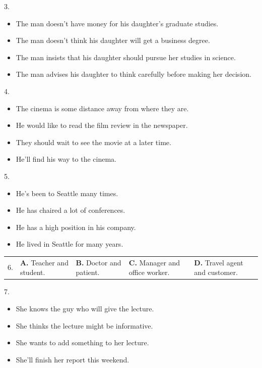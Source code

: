 \documentclass[UTF8,11pt]{ctexart}
\begin{document}
3.


\begin{itemize}[leftmargin=2em,itemsep=.2em,topsep=.4em]\item[A.] The man doesn’t have money for his daughter’s graduate studies.
\item[B.] The man doesn’t think his daughter will get a business degree.
\item[C.] The man insists that his daughter should pursue her studies in science.
\item[D.] The man advises his daughter to think carefully before making her decision.
\end{itemize}

4.


\begin{itemize}[leftmargin=2em,itemsep=.2em,topsep=.4em]\item[A.] The cinema is some distance away from where they are.
\item[B.] He would like to read the film review in the newspaper.
\item[C.] They should wait to see the movie at a later time.
\item[D.] He’ll find his way to the cinema.
\end{itemize}

5.


\begin{itemize}[leftmargin=2em,itemsep=.2em,topsep=.4em]\item[A.] He’s been to Seattle many times.
\item[B.] He has chaired a lot of conferences.
\item[C.] He has a high position in his company.
\item[D.] He lived in Seattle for many years.
\end{itemize}

\noindent\begin{tabularx}{\linewidth}{@{}lXXXX@{}}6. & \textbf{A.} Teacher and student. & \textbf{B.} Doctor and patient. & \textbf{C.} Manager and office worker. & \textbf{D.} Travel agent and customer.\\\end{tabularx}\par

7.


\begin{itemize}[leftmargin=2em,itemsep=.2em,topsep=.4em]\item[A.] She knows the guy who will give the lecture.
\item[B.] She thinks the lecture might be informative.
\item[C.] She wants to add something to her lecture.
\item[D.] She’ll finish her report this weekend.
\end{itemize}
\end{document}

